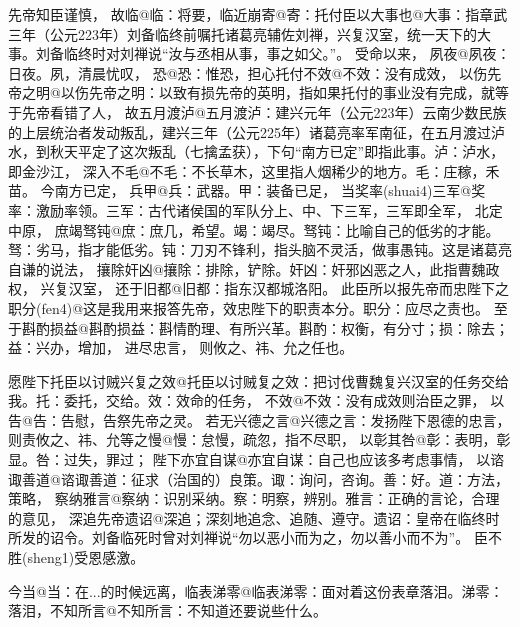 \documentclass[a4paper]{article}
\newcommand{\comment}[1]{{\noindent\kaiti\large #1}}
\begin{document}
先帝知臣谨慎，
故临@{临：将要，临近}崩寄@{寄：托付}臣以大事也@{大事：指章武三年（公元223年）刘备临终前嘱托诸葛亮辅佐刘禅，兴复汉室，统一天下的大事。刘备临终时对刘禅说“汝与丞相从事，事之如父。”}。
受命以来，
夙夜@{夙夜：日夜。夙，清晨}忧叹，
恐@{恐：惟恐，担心}托付不效@{不效：没有成效}，
以伤先帝之明@{以伤先帝之明：以致有损先帝的英明，指如果托付的事业没有完成，就等于先帝看错了人}，
故五月渡泸@{五月渡泸：建兴元年（公元223年）云南少数民族的上层统治者发动叛乱，建兴三年（公元225年）诸葛亮率军南征，在五月渡过泸水，到秋天平定了这次叛乱（七擒孟获），下句“南方已定”即指此事。泸：泸水，即金沙江}，
深入不毛@{不毛：不长草木，这里指人烟稀少的地方。毛：庄稼，禾苗}。
今南方已定，
兵甲@{兵：武器。甲：装备}已足，
当奖率(shuai4)三军@{奖率：激励率领。三军：古代诸侯国的军队分上、中、下三军，三军即全军}，
北定中原，
庶竭驽钝@{庶：庶几，希望。竭：竭尽。驽钝：比喻自己的低劣的才能。驽：劣马，指才能低劣。钝：刀刃不锋利，指头脑不灵活，做事愚钝。这是诸葛亮自谦的说法}，
攘除奸凶@{攘除：排除，铲除。奸凶：奸邪凶恶之人，此指曹魏政权}，
兴复汉室，
还于旧都@{旧都：指东汉都城洛阳}。
此臣所以报先帝而忠陛下之职分(fen4)@{这是我用来报答先帝，效忠陛下的职责本分。职分：应尽之责}也。
至于斟酌损益@{斟酌损益：斟情酌理、有所兴革。斟酌：权衡，有分寸；损：除去；益：兴办，增加}，
进尽忠言，
则攸之、祎、允之任也。

愿陛下托臣以讨贼兴复之效@{托臣以讨贼复之效：把讨伐曹魏复兴汉室的任务交给我。托：委托，交给。效：效命的任务}，
不效@{不效：没有成效}则治臣之罪，
以告@{告：告慰，告祭}先帝之灵。
若无兴德之言@{兴德之言：发扬陛下恩德的忠言}，
则责攸之、祎、允等之慢@{慢：怠慢，疏忽，指不尽职}，
以彰其咎@{彰：表明，彰显。咎：过失，罪过}；
陛下亦宜自谋@{亦宜自谋：自己也应该多考虑事情}，
以谘诹善道@{谘诹善道：征求（治国的）良策。诹：询问，咨询。善：好。道：方法，策略}，
察纳雅言@{察纳：识别采纳。察：明察，辨别。雅言：正确的言论，合理的意见}，
深追先帝遗诏@{深追；深刻地追念、追随、遵守。遗诏：皇帝在临终时所发的诏令。刘备临死时曾对刘禅说“勿以恶小而为之，勿以善小而不为”}。
臣不胜(sheng1)受恩感激。

今当@{当：在...的时候}远离，临表涕零@{临表涕零：面对着这份表章落泪。涕零：落泪}，不知所言@{不知所言：不知道还要说些什么}。



\end{document}
